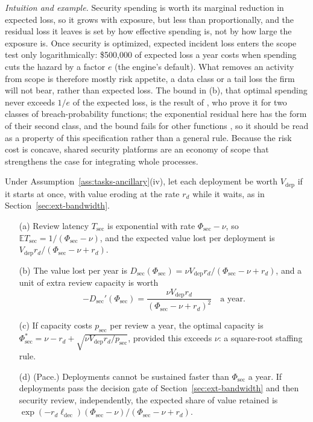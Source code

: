 \noindent\emph{Intuition and example.} Security spending is worth its marginal reduction in expected loss, so it grows with exposure, but less than proportionally, and the residual loss it leaves is set by how effective spending is, not by how large the exposure is. Once security is optimized, expected incident loss enters the scope test only logarithmically: \$500{,}000 of expected loss a year costs \icScope{} when spending \icCs{} cuts the hazard by a factor $e$ (the engine's default). What removes an activity from scope is therefore mostly risk appetite, a data class or a tail loss the firm will not bear, rather than expected loss. The bound in (b), that optimal spending never exceeds $1/e$ of the expected loss, is the result of \citet{gordon2002economics}, who prove it for two classes of breach-probability functions; the exponential residual here has the form of their second class, and the bound fails for other functions \citep{hausken2006returns}, so it should be read as a property of this specification rather than a general rule. Because the risk cost is concave, shared security platforms are an economy of scope that strengthens the case for integrating whole processes.

\begin{proposition}\label{prop:tasks-secreview}
Under Assumption~\ref{ass:tasks-ancillary}(iv), let each deployment be worth $V_{\mathrm{dep}}$ if it starts at once, with value eroding at the rate $r_d$ while it waits, as in Section~\ref{sec:ext-bandwidth}.
\begin{enumerate}
\item[(a)] Review latency $T_{\mathrm{sec}}$ is exponential with rate $\Phi_{\mathrm{sec}}-\nu$, so $\mathbb ET_{\mathrm{sec}}=1/(\Phi_{\mathrm{sec}}-\nu)$, and the expected value lost per deployment is $V_{\mathrm{dep}}r_d/(\Phi_{\mathrm{sec}}-\nu+r_d)$.
\item[(b)] The value lost per year is $D_{\mathrm{sec}}(\Phi_{\mathrm{sec}})=\nu V_{\mathrm{dep}}r_d/(\Phi_{\mathrm{sec}}-\nu+r_d)$, and a unit of extra review capacity is worth
\begin{equation}\label{eq:tasks-secvalue}
-D_{\mathrm{sec}}'(\Phi_{\mathrm{sec}})=\frac{\nu V_{\mathrm{dep}}r_d}{(\Phi_{\mathrm{sec}}-\nu+r_d)^2}\quad\text{a year.}
\end{equation}
\item[(c)] If capacity costs $p_{\mathrm{sec}}$ per review a year, the optimal capacity is $\Phi^*_{\mathrm{sec}}=\nu-r_d+\sqrt{\nu V_{\mathrm{dep}}r_d/p_{\mathrm{sec}}}$, provided this exceeds $\nu$: a square-root staffing rule.
\item[(d)] (Pace.) Deployments cannot be sustained faster than $\Phi_{\mathrm{sec}}$ a year. If deployments pass the decision gate of Section~\ref{sec:ext-bandwidth} and then security review, independently, the expected share of value retained is $\exp(-r_d\ell_{\mathrm{dec}})(\Phi_{\mathrm{sec}}-\nu)/(\Phi_{\mathrm{sec}}-\nu+r_d)$.
\end{enumerate}
\end{proposition}

